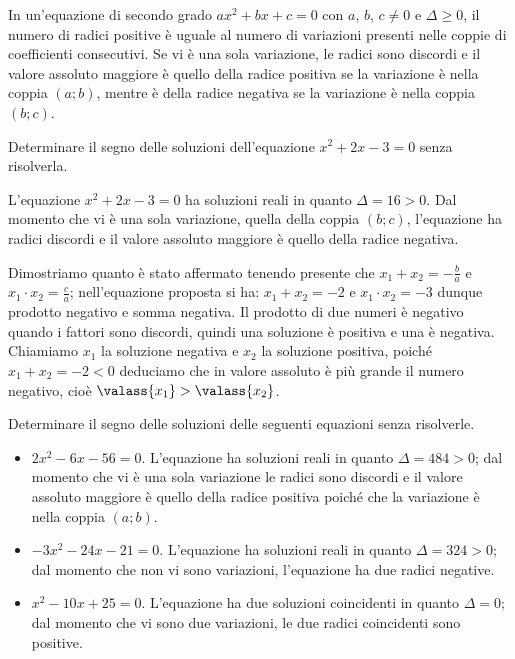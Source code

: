 \begin{teorema}[di Cartesio]
In un'equazione di secondo grado $a x^{2} + b x + c = 0$ con $a$, $b$, $c \neq 0$ e $\Delta \geq 0$, il numero di radici positive è uguale al numero di variazioni presenti nelle coppie di coefficienti consecutivi. Se vi è una sola variazione, le radici sono discordi e il valore assoluto maggiore è quello della radice positiva se la variazione è nella coppia $(a;b)$, mentre è della radice negativa se la variazione è nella coppia $(b;c)$.
\end{teorema}

\begin{exrig}
\begin{esempio}
Determinare il segno delle soluzioni dell'equazione $x^2 + 2 x - 3 = 0$ senza risolverla.

L'equazione $x^2 + 2 x - 3 = 0$ ha soluzioni reali in quanto $\Delta = 16 > 0$. Dal momento che vi è una sola variazione, quella della coppia $(b;c)$, l'equazione ha radici discordi e il valore assoluto maggiore è quello della radice negativa.

Dimostriamo quanto è stato affermato tenendo presente che $x_{1} + x_{2} = - \frac{b}{a}$ e $x_{1}\cdot x_{2} = \frac{c}{a}$; nell'equazione proposta si ha:
$x_{1} + x_{2} = - 2$ e $x_{1} \cdot x_{2} = - 3$ dunque prodotto negativo e somma negativa. Il prodotto di due numeri è negativo quando i fattori sono discordi, quindi una soluzione è positiva e una è negativa. Chiamiamo $x_1$ la soluzione negativa e $x_2$ la soluzione positiva, poiché $x_{1} + x_{2} = - 2 < 0$ deduciamo che in valore assoluto è più grande il numero negativo, cioè $\valass{x_{1}} > \valass{x_{2}}$.
\end{esempio}

\begin{esempio}
Determinare il segno delle soluzioni delle seguenti equazioni senza risolverle.
\begin{itemize}
	\item $2 x^{2} - 6 x - 56 = 0$. L'equazione ha soluzioni reali in quanto $\Delta = 484 > 0$; dal momento che vi è una sola variazione le radici sono discordi
	e il valore assoluto maggiore è quello della radice positiva poiché che la variazione è nella coppia $(a;b)$.
	\item $-3 x^{2} - 24 x - 21 = 0$. L'equazione ha soluzioni reali in quanto $\Delta = 324 > 0$; dal momento che non vi sono variazioni, l'equazione ha due radici negative.
	\item $x^{2} - 10 x + 25 = 0$. L'equazione ha due soluzioni coincidenti in quanto $\Delta = 0$; dal momento che vi sono due variazioni, le due radici coincidenti sono positive.
\end{itemize}
\end{esempio}
\end{exrig}
\vspazio\ovalbox{\risolvi \ref{ese:3.97}}

